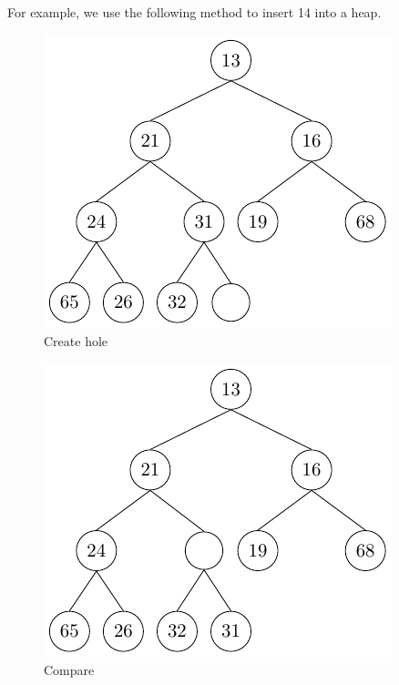 For example, we use the following method to insert 14 into a heap.
\begin{center}
\begin{minipage}{0.33\textwidth}
\begin{figure}[H]
  \centering
  \includegraphics[width=\textwidth]{Figure/HeapI1.pdf}
  \caption{Create hole}
\end{figure}
\end{minipage}
\begin{minipage}{0.33\textwidth}
\begin{figure}[H]
  \centering
  \includegraphics[width=\textwidth]{Figure/HeapI2.pdf}
  \caption{Compare}
\end{figure}
\end{minipage}
\end{center}
